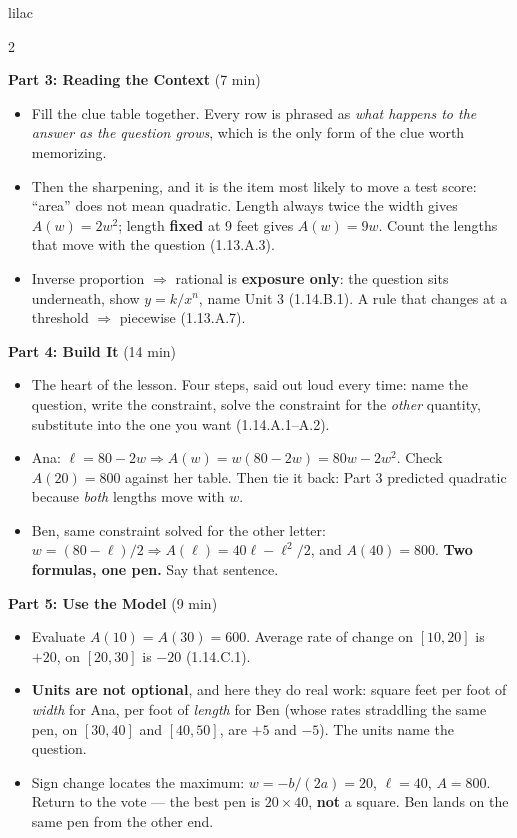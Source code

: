 \documentclass[10pt]{article}
\begin{document}
\begin{skillbox}[Lesson]{lilac}
\begin{multicols}{2}
\columnbreak

\textbf{Part 3: Reading the Context} (7 min)

\begin{itemize}
  \item Fill the clue table together. Every row is phrased as \textit{what
        happens to the answer as the question grows}, which is the only form of
        the clue worth memorizing.
  \item Then the sharpening, and it is the item most likely to move a test
        score: ``area'' does not mean quadratic. Length always twice the width
        gives $A(w) = 2w^2$; length \textbf{fixed} at 9 feet gives $A(w) = 9w$.
        Count the lengths that move with the question (1.13.A.3).
  \item Inverse proportion $\Rightarrow$ rational is \textbf{exposure only}:
        the question sits underneath, show $y = k/x^n$, name Unit 3
        (1.14.B.1). A rule that changes at a threshold $\Rightarrow$ piecewise
        (1.13.A.7).
\end{itemize}

\textbf{Part 4: Build It} (14 min)

\begin{itemize}
  \item The heart of the lesson. Four steps, said out loud every time: name the
        question, write the constraint, solve the constraint for the
        \textit{other} quantity, substitute into the one you want
        (1.14.A.1--A.2).
  \item Ana: $\ell = 80 - 2w \Rightarrow A(w) = w(80-2w) = 80w - 2w^2$. Check
        $A(20) = 800$ against her table. Then tie it back: Part 3 predicted
        quadratic because \textit{both} lengths move with $w$.
  \item Ben, same constraint solved for the other letter:
        $w = (80-\ell)/2 \Rightarrow A(\ell) = 40\ell - \ell^2/2$, and
        $A(40) = 800$. \textbf{Two formulas, one pen.} Say that sentence.
\end{itemize}

\textbf{Part 5: Use the Model} (9 min)

\begin{itemize}
  \item Evaluate $A(10) = A(30) = 600$. Average rate of change on $[10,20]$ is
        $+20$, on $[20,30]$ is $-20$ (1.14.C.1).
  \item \textbf{Units are not optional}, and here they do real work: square feet
        per foot of \textit{width} for Ana, per foot of \textit{length} for Ben
        (whose rates straddling the same pen, on $[30,40]$ and $[40,50]$, are
        $+5$ and $-5$). The units name the question.
  \item Sign change locates the maximum: $w = -b/(2a) = 20$, $\ell = 40$,
        $A = 800$. Return to the vote --- the best pen is $20 \times 40$,
        \textbf{not} a square. Ben lands on the same pen from the other end.
\end{itemize}


\end{multicols}
\end{skillbox}
\end{document}
